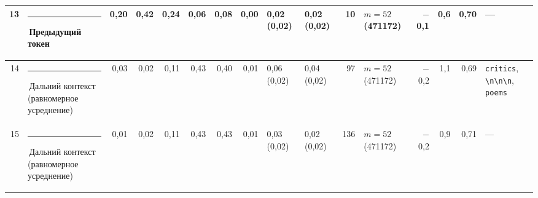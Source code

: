\documentclass[10pt]{article}
\begin{document}
\begin{minipage}{\linewidth}
\begin{center}
{\begin{tabular}{|r|l|r|r|r|r|r|r|l|l|r|l|r|r|r|l|}
13 & \textcolor[HTML]{2A78D6}{\rule{0.62em}{0.62em}}\,\textbf{Предыдущий токен} & 0,20 & 0,42 & 0,24 & 0,06 & 0,08 & 0,00 & 0,02 (0,02) & 0,02 (0,02) & 10 & $m{=}52$ (471172) & $-$0,1 & 0,6 & 0,70 & — \\ \hline
14 & \textcolor[HTML]{C3C2B7}{\rule{0.62em}{0.62em}}\,Дальний контекст (равномерное усреднение) & 0,03 & 0,02 & 0,11 & 0,43 & 0,40 & 0,01 & 0,06 (0,02) & 0,04 (0,02) & 97 & $m{=}52$ (471172) & $-$0,2 & 1,1 & 0,69 & \texttt{\textvisiblespace{}critics}, \texttt{\textvisiblespace{}\textbackslash{}n\textbackslash{}n\textbackslash{}n}, \texttt{\textvisiblespace{}poems} \\ \hline
15 & \textcolor[HTML]{C3C2B7}{\rule{0.62em}{0.62em}}\,Дальний контекст (равномерное усреднение) & 0,01 & 0,02 & 0,11 & 0,43 & 0,43 & 0,01 & 0,03 (0,02) & 0,02 (0,02) & 136 & $m{=}52$ (471172) & $-$0,2 & 0,9 & 0,71 & — \\ \hline
\hline\end{tabular}}\end{center}
\end{minipage}
\par\vspace{0.4em}
\end{document}
